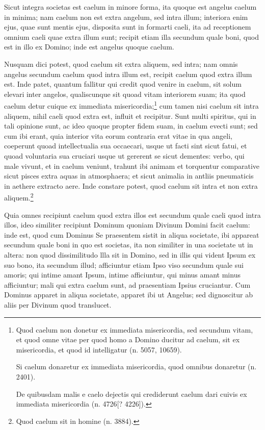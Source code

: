 \begin{topic}{53}
    Sicut integra societas est caelum in minore forma, ita quoque est angelus caelum in minima; nam caelum non est extra
    angelum, sed intra illum; interiora enim ejus, quae sunt mentis ejus, disposita sunt in formarti caeli, ita ad
    receptionem omnium caeli quae extra illum sunt; recipit etiam illa secundum quale boni, quod est in illo ex Domino;
    inde est angelus quoque caelum.
\end{topic}

\begin{topic}{54}
    Nusquam dici potest, quod caelum sit extra aliquem, sed intra; nam omnis angelus secundum caelum quod intra illum
    est, recipit caelum quod extra illum est.
    Inde patet, quantum fallitur qui credit quod venire in caelum, sit solum elevari inter angelos, qualiscunque sit
    quoad vitam interiorem suam; ita quod caelum detur cuique ex immediata misericordia;\footnote{Quod caelum non
    donetur ex immediata misericordia, sed secundum vitam, et quod omne vitae per quod homo a Domino ducitur ad caelum,
    sit ex misericordia, et quod id intelligatur (n. 5057, 10659).

    Si caelum donaretur ex immediata misericordia, quod omnibus donaretur (n. 2401).

    De quibusdam malis e caelo dejectis qui crediderunt caelum dari cuivis ex immediata misericordia (n. 4726[? 4226]).}
    cum tamen nisi caelum sit intra aliquem, nihil caeli quod extra est, influit et recipitur.
    Sunt multi spiritus, qui in tali opinione sunt, ac ideo quoque propter fidem suam, in caelum evecti sunt; sed cum
    ibi erant, quia interior vita eorum contraria erat vitae in qua angeli, coeperunt quoad intellectualia sua
    occaecari, usque ut facti sint sicut fatui, et quoad voluntaria sua cruciari usque ut gererent se sicut dementes:
    verbo, qui male vivunt, et in caelum veniunt, trahunt ibi animam et torquentur comparative sicut pisces extra aquas
    in atmosphaera; et sicut animalia in antliis pneumaticis in aethere extracto aere.
    Inde constare potest, quod caelum sit intra et non extra aliquem.\footnote{Quod caelum sit in homine (n. 3884).}
\end{topic}

\begin{topic}{55}
    Quia omnes recipiunt caelum quod extra illos est secundum quale caeli quod intra illos, ideo similiter recipiunt
    Dominum quoniam Divinum Domini facit caelum: inde est, quod cum Dominus Se praesentem sistit in aliqua societate,
    ibi appareat secundum quale boni in quo est societas, ita non similiter in una societate ut in altera: non quod
    dissimilitudo llla sit in Domino, sed in illis qui vident Ipsum ex suo bono, ita secundum illud; afficiuntur etiam
    Ipso viso secundum quale sui amoris; qui intime amant Ipsum, intime afficiuntur, qui minus amant minus afficiuntur;
    mali qui extra caelum sunt, ad praesentiam Ipsius cruciantur.
    Cum Dominus apparet in aliqua societate, apparet ibi ut Angelus; sed dignoscitur ab aliis per Divinum quod
    translucet.
\end{topic}

